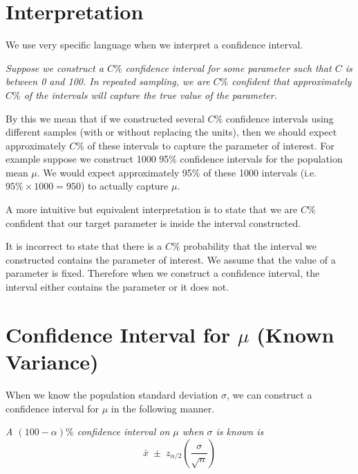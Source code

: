 \section{Interpretation}

We use very specific language when we interpret a confidence interval.

\begin{tcolorbox}[
    colback=yellow!10, 
    colframe=black!80, 
    sharp corners=south, 
    boxrule=0.5pt,
    breakable,
    enhanced
]
\textit{Suppose we construct a $C\%$ confidence interval for some parameter such that $C$ is between 0 and 100. In repeated sampling, we are $C\%$ confident that approximately $C\%$ of the intervals will capture the true value of the parameter.}
\end{tcolorbox}

\bigskip

By this we mean that if we constructed several $C\%$ confidence intervals using different samples (with or without replacing the units), then we should expect approximately $C\%$ of these intervals to capture the parameter of interest. For example suppose we construct 1000 95\% confidence intervals for the population mean $\mu$. We would expect approximately 95\% of these 1000 intervals (i.e.\ $95\% \times 1000 = 950$) to actually capture $\mu$.



\begin{nt}
A more intuitive but equivalent interpretation is to state that we are $C$\% confident that our target parameter is inside the interval constructed.
\end{nt}

It is incorrect to state that there is a $C\%$ probability that 
the interval we constructed contains the parameter of interest.
We assume that the value of a parameter is fixed. Therefore when we construct a confidence interval, the interval either contains the parameter or it does not.
\section{Confidence Interval for $\mu$ (Known Variance)}
When we know the population standard deviation $\sigma$, we can construct a confidence interval for $\mu$ in the following manner.

\begin{tcolorbox}[
    colback=yellow!10, 
    colframe=black!45, 
    sharp corners=south, 
    boxrule=0.5pt,
    breakable,
    enhanced,
    title={\textbf{Confidence Interval 6.1} (Confidence Interval on $\mu$ when $\sigma$ is Known)}
]

\textit{A $(100 - \alpha)\%$ confidence interval on $\mu$ when $\sigma$ is known is}
\[
\bar{x} \; \pm \; z_{\alpha/2} \left( \frac{\sigma}{\sqrt{n}} \right)
\]

\end{tcolorbox}

